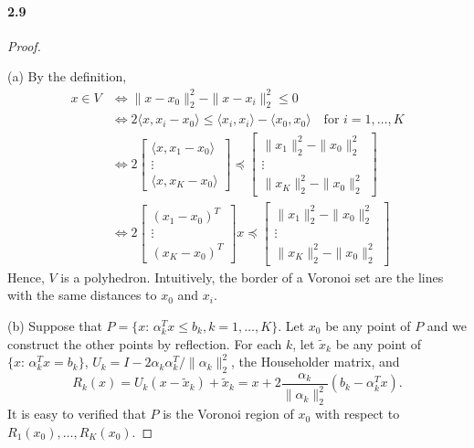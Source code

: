 \paragraph{2.9}
\begin{proof}
  $\,$\par
  (a) By the definition, 
  \begin{align*}
    x\in V &\Leftrightarrow \|x-x_0\|_2^2-\|x-x_i\|_2^2 \le 0  \\
    &\Leftrightarrow 2\langle x,x_i-x_0\rangle 
      \le \langle x_i,x_i\rangle - \langle x_0,x_0\rangle
      \quad\text{for $i=1,\dots,K$}\\
    &\Leftrightarrow
      2\begin{bmatrix}
        \langle x,x_1-x_0 \rangle \\ \vdots \\ \langle x,x_K-x_0 \rangle
      \end{bmatrix}
      \preceq\begin{bmatrix}
        \|x_1\|_2^2-\|x_0\|_2^2 \\ \vdots \\ \|x_K\|_2^2-\|x_0\|_2^2
      \end{bmatrix} \\
    &\Leftrightarrow
    2\begin{bmatrix}
      (x_1-x_0)^T \\ \vdots \\ (x_K-x_0)^T
    \end{bmatrix}x
    \preceq\begin{bmatrix}
      \|x_1\|_2^2-\|x_0\|_2^2 \\ \vdots \\ \|x_K\|_2^2-\|x_0\|_2^2
    \end{bmatrix}
  \end{align*}
  Hence, $V$ is a polyhedron. Intuitively, the border of a Voronoi set are the 
  lines with the same distances to $x_0$ and $x_i$. \par
  (b) Suppose that $P=\{x:\,\alpha_k^Tx\le b_k, k=1,\dots,K\}$. Let $x_0$ be any
  point of $P$ and we construct the other points by reflection. For each $k$, 
  let $\tilde{x}_k$ be any point of $\{x:\,\alpha_k^Tx=b_k\}$, $U_k=I-2\alpha_k
  \alpha_k^T/\|\alpha_k\|^2_2$, the Householder matrix, and 
  \[
    R_k(x) = U_k(x-\tilde{x}_k)+\tilde{x}_k = 
    x + 2\frac{\alpha_k}{\|\alpha_k\|_2^2}(b_k-\alpha_k^Tx).
  \]
  It is easy to verified that $P$ is the Voronoi region of $x_0$ with respect to
  $R_1(x_0),\dots,R_K(x_0)$.
\end{proof}

